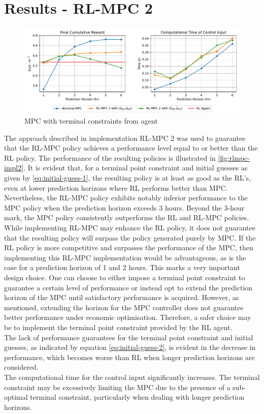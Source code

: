 \section{Results - RL-MPC 2}

\begin{figure}[H]
	\centering
	\includegraphics[width=\textwidth]{figures/rl_mpc_impl_2.pdf}
	\caption{MPC with terminal constraints from agent}
	\label{fig:rlmpc-impl2}
\end{figure}

The approach described in implementation RL-MPC 2 was used to guarantee that the RL-MPC policy achieves a performance level equal to or better than the RL policy. The performance of the resulting policies is illustrated in \autoref{fig:rlmpc-impl2}. It is evident that, for a terminal point constraint and initial guesses as given by \autoref{eq:initial-guess-1}, the resulting policy is at least as good as the RL's, even at lower prediction horizons where RL performs better than MPC. Nevertheless, the RL-MPC policy exhibits notably inferior performance to the MPC policy when the prediction horizon exceeds 3 hours. Beyond the 3-hour mark, the MPC policy consistently outperforms the RL and RL-MPC policies.  While implementing RL-MPC may enhance the RL policy, it does not guarantee that the resulting policy will surpass the policy generated purely by MPC. If the RL policy is more competitive and surpasses the performance of the MPC, then implementing this RL-MPC implementation would be advantageous, as is the case for a prediction horizon of 1 and 2 hours. This marks a very important design choice. One can choose to either impose a terminal point constraint to guarantee a certain level of performance or instead opt to extend the prediction horizon of the MPC until satisfactory performance is acquired. However, as mentioned, extending the horizon for the MPC controller does not guarantee better performance under economic optimisation. Therefore, a safer choice may be to implement the terminal point constraint provided by the RL agent.
\\
The lack of performance guarantees for the terminal point constraint and initial guesses, as indicated by equation \autoref{eq:initial-guess-2}, is evident in the decrease in performance, which becomes worse than RL when longer prediction horizons are considered.\\
The computational time for the control input significantly increases. The terminal constraint may be excessively limiting the MPC due to the presence of a sub-optimal terminal constraint, particularly when dealing with longer prediction horizons.

